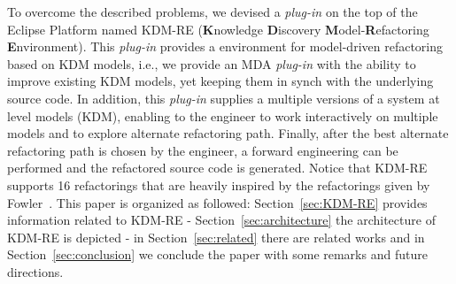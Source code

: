 To overcome the described problems, we devised a \textit{plug-in} on the top of the Eclipse Platform named KDM-RE (\textbf{K}nowledge \textbf{D}iscovery \textbf{M}odel-\textbf{R}efactoring \textbf{E}nvironment). 
This \textit{plug-in} provides a environment for model-driven refactoring based on KDM models, i.e., we provide an MDA \textit{plug-in} with the ability to improve existing KDM models, yet keeping them in synch with the underlying source code. 
In addition, this \textit{plug-in} supplies a multiple versions of a system at level models (KDM), enabling to the engineer  to work interactively on multiple models and to explore alternate refactoring path. Finally, after the best alternate refactoring path is chosen by the engineer, a forward engineering can be performed and the refactored source code is generated. Notice that KDM-RE supports 16 refactorings that are heavily inspired by the refactorings given by Fowler~\cite{refactImpro}. This paper is organized as followed: Section~\ref{sec:KDM-RE} provides information related to KDM-RE - Section~\ref{sec:architecture} the architecture of KDM-RE is depicted - in Section~\ref{sec:related} there are related works and in Section~\ref{sec:conclusion} we conclude the paper with some remarks and future directions.







